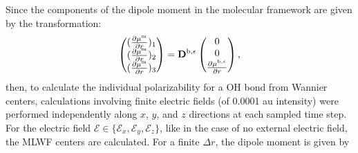         Since the components of the dipole moment in the molecular framework are given by the transformation:
        \begin{subequations}
          \begin{align}
            \left(
            \begin{matrix}
              (\frac{\partial \mu^\text{m}}{\partial r})_1\\
              (\frac{\partial \mu^\text{m}}{\partial r})_2\\
              (\frac{\partial \mu^\text{m}}{\partial r})_3
            \end{matrix}
            \right)
            = {\bf D}^{\text{b},\epsilon}
            \left(
            \begin{matrix}
              0\\
              0\\
              \frac{\partial \mu^{\text{b},\epsilon}}{\partial r}
            \end{matrix}
            \right),
            \end{align}
        \end{subequations}
    then, to calculate the individual polarizability for a OH bond from Wannier centers, 
    calculations involving finite electric fields (of 0.0001 au intensity) were performed independently 
    along $x$, $y$, and $z$ directions at each sampled time step. \cite{sulpizi2013}
    For the electric field $\mathscr{E} \in \{\mathscr{E}_x,\mathscr{E}_y, \mathscr{E}_z\}$,
       like in the case of no external electric field, the MLWF centers are calculated. %
 For a finite $\Delta r$, the dipole moment is given by 
